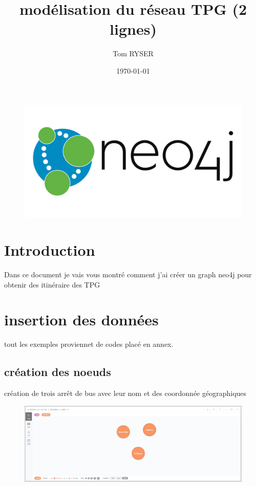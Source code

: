 \documentclass[a4paper,12pt]{article}
\title{modélisation du réseau TPG (2 lignes)}
\author{Tom RYSER}
\date{\today}
\begin{document}
\begin{figure}
    \centering
    \includegraphics[width=\linewidth]{img/logo.png}
    \maketitle
\end{figure}
\thispagestyle{empty}
  \clearpage 
\tableofcontents  \clearpage 
\section{Introduction}
Dans ce document je vais vous montré comment j'ai créer un graph neo4j pour obtenir des itinéraire des TPG
\section{insertion des données}
\danger tout les exemples proviennet de codes placé en annex.
\subsection{création des noeuds}
création de trois arrêt de bus avec leur nom et des coordonnée géographiques


\begin{figure}[h]
    \centering
    \includegraphics[width=\linewidth]{img/3nodes.png}
\end{figure}
\end{document}
